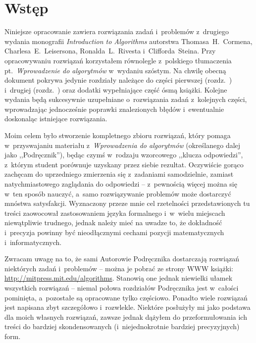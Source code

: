 \chapter{Wstęp}

Niniejsze opracowanie zawiera rozwiązania zadań i~problemów z~drugiego wydania monografii \textsl{Introduction to Algorithms} \cite{cormen} autorstwa Thomasa~H.~Cormena, Charlesa~E.~Leisersona, Ronalda~L.~Rivesta i~Clifforda~Steina. Przy opracowywaniu rozwiązań korzystałem równolegle z~polskiego tłumaczenia pt.~\textsl{Wprowadzenie do algorytmów} \cite{cormenpl} w~wydaniu szóstym. Na chwilę obecną dokument pokrywa jedynie rozdziały należące do części pierwszej (rozdz.~) i~drugiej (rozdz.~) oraz dodatki wypełniające część ósmą książki. Kolejne wydania będą sukcesywnie uzupełniane o~rozwiązania zadań z~kolejnych części, wprowadzając jednocześnie poprawki znalezionych błędów i~ewentualnie doskonaląc istniejące rozwiązania.

Moim celem było stworzenie kompletnego zbioru rozwiązań, który pomaga w~przyswajaniu materiału z~\textsl{Wprowadzenia do algorytmów} (określanego dalej jako ,,Podręcznik''), będąc czymś w~rodzaju wzorcowego ,,klucza odpowiedzi'', z~którym student porównuje uzyskany przez siebie rezultat. Oczywiście gorąco zachęcam do uprzedniego zmierzenia się z~zadaniami samodzielnie, zamiast natychmiastowego zaglądania do odpowiedzi -- z~pewnością więcej można się w~ten sposób nauczyć, a~samo rozwiązywanie problemów może dostarczyć mnóstwa satysfakcji. Wyznaczony przeze mnie cel rzetelności przedstawionych tu treści zaowocował zastosowaniem języka formalnego i~w~wielu miejscach niewątpliwie trudnego, jednak należy mieć na uwadze to, że dokładność i~precyzja powinny być nieodłącznymi cechami pozycji matematycznych i~informatycznych.

Zwracam uwagę na to, że sami Autorowie Podręcznika dostarczają rozwiązań niektórych zadań i~problemów -- można je pobrać ze strony WWW książki: \url{http://mitpress.mit.edu/algorithms}. Stanowią one jednak niewielki ułamek wszystkich rozwiązań -- niemal połowa rozdziałów Podręcznika jest w~całości pominięta, a~pozostałe są opracowane tylko częściowo. Ponadto wiele rozwiązań jest napisana zbyt szczegółowo i~rozwlekle. Niektóre posłużyły mi jako podstawa dla moich własnych rozwiązań, zawsze jednak dążyłem do przeformułowania ich treści do bardziej skondensowanych (i~niejednokrotnie bardziej precyzyjnych) form.

